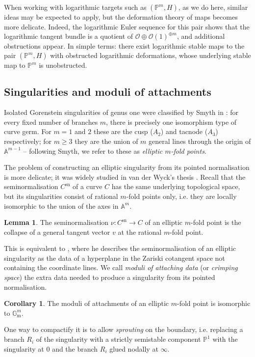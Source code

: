 \documentclass[11pt]{amsart}
\newcommand{\PP}{\mathbb P}
\renewcommand{\to}{\rightarrow}
\newcommand{\Aaff}{\mathbb{A}}
\theoremstyle{definition}
\newtheorem{lemma}[thm]{Lemma}
\newtheorem{cor}[thm]{Corollary}
\theoremstyle{definition}
\begin{document}
When working with logarithmic targets such as $(\mathbb P^m,H)$, as we do here, similar ideas may be expected to apply, but the deformation theory of maps becomes more delicate. Indeed, the logarithmic Euler sequence for this pair shows that the logarithmic tangent bundle is a quotient of $\mathcal O\oplus\mathcal O(1)^{\oplus m}$, and additional obstructions appear. In simple terms: there exist logarithmic stable maps to the pair $(\mathbb P^m,H)$ with obstructed logarithmic deformations, whose underlying stable map to $\PP^m$ is unobstructed. 

\subsection{Singularities and moduli of attachments}\label{S:ellsing} Isolated Gorenstein singularities of genus one were classified by Smyth in \cite{SMY1}: for every fixed number of branches $m$, there is precisely one isomorphism type of curve germ. For $m=1$ and $2$ these are the cusp ($A_2$) and tacnode ($A_3$) respectively; for $m\geq 3$ they are the union of $m$ general lines through the origin of $\Aaff^{m-1}$ -- following Smyth, we refer to these as \emph{elliptic $m$-fold points}.

The problem of constructing an elliptic singularity from its pointed normalisation is more delicate; it was widely studied in van der Wyck's thesis \cite{vdW}. Recall that the seminormalisation $C^\text{sn}$ of a curve $C$ has the same underlying topological space, but its singularities consist of rational $m$-fold points only, i.e. they are locally isomorphic to the union of the axes in $\Aaff^m$.

\begin{lemma}\label{lem:pushout}
 The seminormalisation $\nu\colon C^\text{sn}\to C$ of an elliptic $m$-fold point is the collapse of a general tangent vector $v$ at the rational $m$-fold point.
\end{lemma}

\noindent This is equivalent to \cite[Lemma 2.2]{SMY1}, where he describes the seminormalisation of an elliptic singularity as the data of a hyperplane in the Zariski cotangent space not containing the coordinate lines. We call \emph{moduli of attaching data} \cite[\S 2.2]{SMY2} (or \emph{crimping space}) the extra data needed to produce a singularity from its pointed normalisation.

\begin{cor}
 The moduli of attachments of an elliptic $m$-fold point is isomorphic to $\mathbb G_{\text{m}}^m$.
\end{cor}
\noindent One way to compactify it is to allow \emph{sprouting} on the boundary, i.e. replacing a branch $R_i$ of the singularity with a strictly semistable component $\PP^1$ with the singularity at $0$ and the branch $R_i$ glued nodally at $\infty$.
\end{document}
